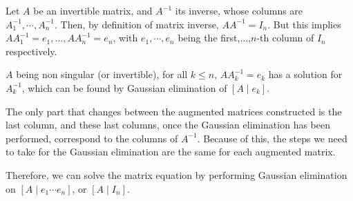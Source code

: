 \documentclass[12pt]{article}
\begin{document}
  Let $A$ be an invertible matrix, and $A^{-1}$ its inverse, whose
  columns are $A^{-1}_1,\cdots,A^{-1}_n$.
  Then, by definition of matrix inverse, $AA^{-1}=I_n$.
  But this implies
  $AA^{-1}_1 = e_1,\ldots,AA^{-1}_n = e_n$, 
  with $e_1,\cdots,e_n$ being the first,$\ldots$,$n$-th column of $I_n$
  respectively.

  $A$ being non singular (or invertible), for all $k \leq n$, $AA^{-1}_k = e_k$ has a solution for $A^{-1}_k$, which can
  be found by Gaussian elimination of $[A \mid e_k]$.

  The only part that changes between the augmented matrices
  constructed is the last column, and these last columns, once the
  Gaussian elimination has been performed, correspond to the columns
  of $A^{-1}$.  Because of this, the steps we need to take for the
  Gaussian elimination are the same for each augmented matrix.

  Therefore, we can solve the matrix equation by performing Gaussian
  elimination on $[A \mid e_1 \cdots e_n]$, or $[A \mid I_n]$.
\end{document}
